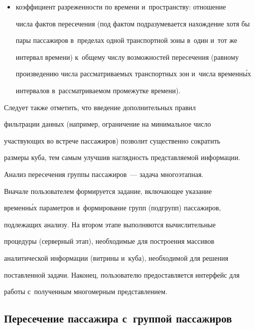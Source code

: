 \begin{itemize}
\item коэффициент разреженности по времени и~пространству: отношение 


числа фактов пересечения (под фактом подразумевается нахождение хотя бы 


пары пассажиров в~пределах одной транспортной зоны в~один и~тот же 


интервал времени) к~общему числу возможностей пересечения (равному 


произведению числа рассматриваемых транспортных зон и~числа временн\'{ы}х 


интервалов в~рассматриваемом промежутке времени).


\end{itemize}





      Следует также отметить, что введение дополнительных правил 


фильтрации данных (например, ограничение на минимальное число 


участвующих во встрече пассажиров) позволит существенно сократить 


размеры куба, тем самым улучшив наглядность представляемой информации.


      


      Анализ пересечения группы пассажиров~--- задача многоэтапная. 


Вначале пользователем формируется задание, включающее указание 


временн\'{ы}х па\-ра\-мет\-ров и~формирование групп (подгрупп) пассажиров, 


подлежащих анализу. На втором этапе выполняются вычислительные 


процедуры (серверный этап), необходимые для построения массивов 


аналитической информации (витрины и~куба), необходимой для решения 


поставленной задачи. Наконец, пользователю предостав\-ля\-ет\-ся интерфейс для 


работы с~полученным многомерным пред\-став\-ле\-нием.





\vspace*{-3pt}


      


\subsection{Пересечение пассажира с~группой пассажиров}





